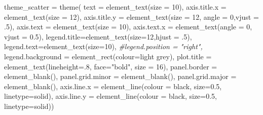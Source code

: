 \documentclass[
]{article}
\newenvironment{Shaded}{\begin{snugshade}}{\end{snugshade}}
\newcommand{\AttributeTok}[1]{\textcolor[rgb]{0.77,0.63,0.00}{#1}}
\newcommand{\CommentTok}[1]{\textcolor[rgb]{0.56,0.35,0.01}{\textit{#1}}}
\newcommand{\DecValTok}[1]{\textcolor[rgb]{0.00,0.00,0.81}{#1}}
\newcommand{\FloatTok}[1]{\textcolor[rgb]{0.00,0.00,0.81}{#1}}
\newcommand{\FunctionTok}[1]{\textcolor[rgb]{0.00,0.00,0.00}{#1}}
\newcommand{\NormalTok}[1]{#1}
\newcommand{\OtherTok}[1]{\textcolor[rgb]{0.56,0.35,0.01}{#1}}
\newcommand{\StringTok}[1]{\textcolor[rgb]{0.31,0.60,0.02}{#1}}
\begin{document}
\begin{Shaded}
\begin{Highlighting}[]
\NormalTok{theme\_scatter }\OtherTok{=} \FunctionTok{theme}\NormalTok{(}
\AttributeTok{text =} \FunctionTok{element\_text}\NormalTok{(}\AttributeTok{size =} \DecValTok{10}\NormalTok{),}
\AttributeTok{axis.title.x =} \FunctionTok{element\_text}\NormalTok{(}\AttributeTok{size =} \DecValTok{12}\NormalTok{),}
\AttributeTok{axis.title.y =} \FunctionTok{element\_text}\NormalTok{(}\AttributeTok{size =} \DecValTok{12}\NormalTok{, }\AttributeTok{angle =} \DecValTok{0}\NormalTok{,}\AttributeTok{vjust =}\NormalTok{ .}\DecValTok{5}\NormalTok{),}
\AttributeTok{axis.text =} \FunctionTok{element\_text}\NormalTok{(}\AttributeTok{size =} \DecValTok{10}\NormalTok{),}
\AttributeTok{axis.text.x =} \FunctionTok{element\_text}\NormalTok{(}\AttributeTok{angle =} \DecValTok{0}\NormalTok{, }\AttributeTok{vjust =} \FloatTok{0.5}\NormalTok{),}
\AttributeTok{legend.title=}\FunctionTok{element\_text}\NormalTok{(}\AttributeTok{size=}\DecValTok{12}\NormalTok{,}\AttributeTok{hjust =}\NormalTok{ .}\DecValTok{5}\NormalTok{),}
\AttributeTok{legend.text=}\FunctionTok{element\_text}\NormalTok{(}\AttributeTok{size=}\DecValTok{10}\NormalTok{),}
\CommentTok{\#legend.position = "right",}
\AttributeTok{legend.background =} \FunctionTok{element\_rect}\NormalTok{(}\AttributeTok{colour=}\StringTok{\textquotesingle{}light grey\textquotesingle{}}\NormalTok{),}
\AttributeTok{plot.title =} \FunctionTok{element\_text}\NormalTok{(}\AttributeTok{lineheight=}\NormalTok{.}\DecValTok{8}\NormalTok{, }\AttributeTok{face=}\StringTok{"bold"}\NormalTok{, }\AttributeTok{size =} \DecValTok{16}\NormalTok{),}
\AttributeTok{panel.border =} \FunctionTok{element\_blank}\NormalTok{(),}
\AttributeTok{panel.grid.minor =} \FunctionTok{element\_blank}\NormalTok{(),}
\AttributeTok{panel.grid.major =} \FunctionTok{element\_blank}\NormalTok{(),}
\AttributeTok{axis.line.x =} \FunctionTok{element\_line}\NormalTok{(}\AttributeTok{colour =} \StringTok{\textquotesingle{}black\textquotesingle{}}\NormalTok{, }\AttributeTok{size=}\FloatTok{0.5}\NormalTok{, }\AttributeTok{linetype=}\StringTok{\textquotesingle{}solid\textquotesingle{}}\NormalTok{),}
\AttributeTok{axis.line.y =} \FunctionTok{element\_line}\NormalTok{(}\AttributeTok{colour =} \StringTok{\textquotesingle{}black\textquotesingle{}}\NormalTok{, }\AttributeTok{size=}\FloatTok{0.5}\NormalTok{, }\AttributeTok{linetype=}\StringTok{\textquotesingle{}solid\textquotesingle{}}\NormalTok{))}
\end{Highlighting}
\end{Shaded}
\end{document}
